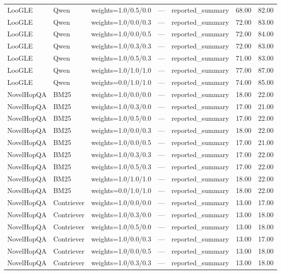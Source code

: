 \begin{tabular}{lllllll}
LooGLE & Qwen & weights=1.0/0.5/0.0 & — & reported\_summary & 68.00 & 82.00 \\
LooGLE & Qwen & weights=1.0/0.0/0.3 & — & reported\_summary & 72.00 & 83.00 \\
LooGLE & Qwen & weights=1.0/0.0/0.5 & — & reported\_summary & 72.00 & 84.00 \\
LooGLE & Qwen & weights=1.0/0.3/0.3 & — & reported\_summary & 72.00 & 83.00 \\
LooGLE & Qwen & weights=1.0/0.5/0.3 & — & reported\_summary & 71.00 & 83.00 \\
LooGLE & Qwen & weights=1.0/1.0/1.0 & — & reported\_summary & 77.00 & 87.00 \\
LooGLE & Qwen & weights=0.0/1.0/1.0 & — & reported\_summary & 74.00 & 85.00 \\
NovelHopQA & BM25 & weights=1.0/0.0/0.0 & — & reported\_summary & 18.00 & 22.00 \\
NovelHopQA & BM25 & weights=1.0/0.3/0.0 & — & reported\_summary & 17.00 & 21.00 \\
NovelHopQA & BM25 & weights=1.0/0.5/0.0 & — & reported\_summary & 17.00 & 22.00 \\
NovelHopQA & BM25 & weights=1.0/0.0/0.3 & — & reported\_summary & 18.00 & 22.00 \\
NovelHopQA & BM25 & weights=1.0/0.0/0.5 & — & reported\_summary & 17.00 & 21.00 \\
NovelHopQA & BM25 & weights=1.0/0.3/0.3 & — & reported\_summary & 17.00 & 22.00 \\
NovelHopQA & BM25 & weights=1.0/0.5/0.3 & — & reported\_summary & 17.00 & 22.00 \\
NovelHopQA & BM25 & weights=1.0/1.0/1.0 & — & reported\_summary & 18.00 & 22.00 \\
NovelHopQA & BM25 & weights=0.0/1.0/1.0 & — & reported\_summary & 18.00 & 22.00 \\
NovelHopQA & Contriever & weights=1.0/0.0/0.0 & — & reported\_summary & 13.00 & 17.00 \\
NovelHopQA & Contriever & weights=1.0/0.3/0.0 & — & reported\_summary & 13.00 & 18.00 \\
NovelHopQA & Contriever & weights=1.0/0.5/0.0 & — & reported\_summary & 13.00 & 18.00 \\
NovelHopQA & Contriever & weights=1.0/0.0/0.3 & — & reported\_summary & 13.00 & 17.00 \\
NovelHopQA & Contriever & weights=1.0/0.0/0.5 & — & reported\_summary & 13.00 & 18.00 \\
NovelHopQA & Contriever & weights=1.0/0.3/0.3 & — & reported\_summary & 13.00 & 18.00 \\

\end{tabular}
